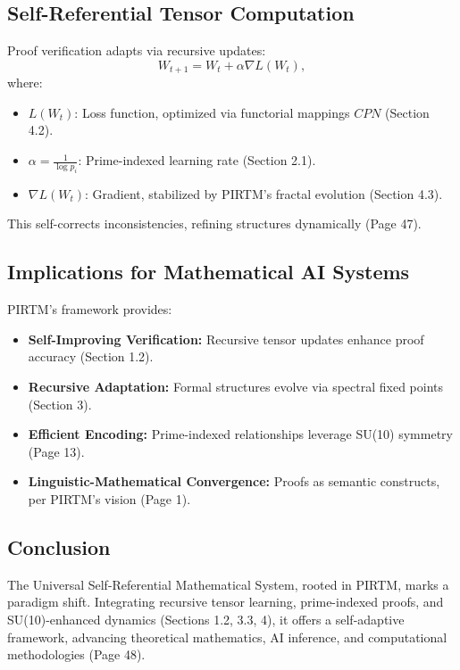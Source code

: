 \documentclass{article}
\theoremstyle{plain}
\begin{document}
\subsection{Self-Referential Tensor Computation}
Proof verification adapts via recursive updates:
\begin{equation}
W_{t+1} = W_t + \alpha \nabla L(W_t),
\end{equation}
where:
\begin{itemize}
    \item \( L(W_t) \): Loss function, optimized via functorial mappings \( CPN \) (Section 4.2).
    \item \( \alpha = \frac{1}{\log p_i} \): Prime-indexed learning rate (Section 2.1).
    \item \( \nabla L(W_t) \): Gradient, stabilized by PIRTM’s fractal evolution (Section 4.3).
\end{itemize}
This self-corrects inconsistencies, refining structures dynamically (Page 47).

\subsection{Implications for Mathematical AI Systems}
PIRTM’s framework provides:
\begin{itemize}
    \item \textbf{Self-Improving Verification:} Recursive tensor updates enhance proof accuracy (Section 1.2).
    \item \textbf{Recursive Adaptation:} Formal structures evolve via spectral fixed points (Section 3).
    \item \textbf{Efficient Encoding:} Prime-indexed relationships leverage SU(10) symmetry (Page 13).
    \item \textbf{Linguistic-Mathematical Convergence:} Proofs as semantic constructs, per PIRTM’s vision (Page 1).
\end{itemize}

\subsection{Conclusion}
The Universal Self-Referential Mathematical System, rooted in PIRTM, marks a paradigm shift. Integrating recursive tensor learning, prime-indexed proofs, and SU(10)-enhanced dynamics (Sections 1.2, 3.3, 4), it offers a self-adaptive framework, advancing theoretical mathematics, AI inference, and computational methodologies (Page 48).
\nocite{*}


\end{document}
